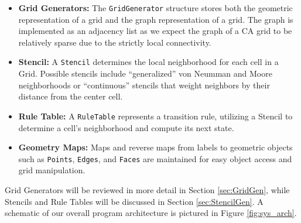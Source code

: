 \documentclass[a4paper,11pt,twoside]{report}
\begin{document}
\begin{itemize}

\item \textbf{Grid Generators:} The \texttt{GridGenerator} structure stores both the geometric representation of a grid and the graph representation of a grid. The graph is implemented as an adjacency list as we expect the graph of a CA grid to be relatively sparse due to the strictly local connectivity.

\item \textbf{Stencil:} A \texttt{Stencil} determines the local neighborhood for each cell in a Grid. Possible stencils include ``generalized'' von Neumman and Moore neighborhoods or ``continuous'' stencils that weight neighbors by their distance from the center cell.

\item \textbf{Rule Table:} A \texttt{RuleTable} represents a transition rule, utilizing a Stencil to determine a cell's neighborhood and compute its next state.

\item \textbf{Geometry Maps:} Maps and reverse maps from labels to geometric objects such as \texttt{Points}, \texttt{Edges}, and \texttt{Faces} are maintained for easy object access and grid manipulation.

\end{itemize}

Grid Generators will be reviewed in more detail in Section \ref{sec:GridGen}, while Stencils and Rule Tables will be discussed in Section \ref{sec:StencilGen}. A schematic of our overall program architecture is pictured in Figure \ref{fig:sys_arch}.
\end{document}
